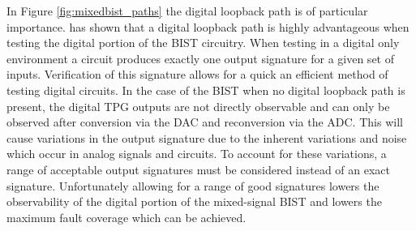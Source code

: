 \documentclass[12pt]{report}
\begin{document}
In Figure \ref{fig:mixedbist_paths} the digital loopback path is of particular importance.  \cite{stroud-analog} has shown that a digital loopback path is highly advantageous when testing the digital portion of the BIST circuitry.  When testing in a digital only environment a circuit produces exactly one output signature for a given set of inputs.  Verification of this signature allows for a quick an efficient method of testing digital circuits.  In the case of the BIST when no digital loopback path is present, the digital TPG outputs are not directly observable and can only be observed after conversion via the DAC and reconversion via the ADC.  This will cause variations in the output signature due to the inherent variations and noise which occur in analog signals and circuits.   To account for these variations, a range of acceptable output signatures must be considered instead of an exact signature\cite{stroud-analog}.  Unfortunately allowing for a range of good signatures lowers the observability of the digital portion of the mixed-signal BIST and lowers the maximum fault coverage which can be achieved.
\end{document}
